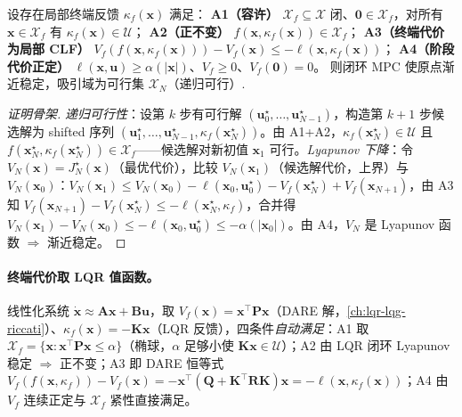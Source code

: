 \begin{theorem}
\label{thm:ddp-mayne}
设存在局部终端反馈 $\kappa_f(\mathbf{x})$ 满足：
\textbf{A1（容许）} $\mathcal{X}_f\subseteq\mathcal{X}$ 闭、$\mathbf{0}\in\mathcal{X}_f$，对所有 $\mathbf{x}\in\mathcal{X}_f$ 有 $\kappa_f(\mathbf{x})\in\mathcal{U}$；
\textbf{A2（正不变）} $f(\mathbf{x},\kappa_f(\mathbf{x}))\in\mathcal{X}_f$；
\textbf{A3（终端代价为局部 CLF）} $V_f(f(\mathbf{x},\kappa_f(\mathbf{x})))-V_f(\mathbf{x})\le-\ell(\mathbf{x},\kappa_f(\mathbf{x}))$；
\textbf{A4（阶段代价正定）} $\ell(\mathbf{x},\mathbf{u})\ge\alpha(|\mathbf{x}|)$、$V_f\ge0$、$V_f(\mathbf{0})=0$。
则闭环 MPC 使原点渐近稳定，吸引域为可行集 $\mathcal{X}_N$（递归可行）\cite{mayne2000constrained}.
\end{theorem}
\begin{proof}[证明骨架]
\emph{递归可行性}：设第 $k$ 步有可行解 $(\mathbf{u}_0^\star,\dots,\mathbf{u}_{N-1}^\star)$，构造第 $k+1$ 步候选解为 shifted 序列 $(\mathbf{u}_1^\star,\dots,\mathbf{u}_{N-1}^\star,\kappa_f(\mathbf{x}_N^\star))$。由 A1+A2，$\kappa_f(\mathbf{x}_N^\star)\in\mathcal{U}$ 且 $f(\mathbf{x}_N^\star,\kappa_f(\mathbf{x}_N^\star))\in\mathcal{X}_f$——候选解对新初值 $\mathbf{x}_1$ 可行。\emph{Lyapunov 下降}：令 $V_N(\mathbf{x})=J_N^\star(\mathbf{x})$（最优代价），比较 $V_N(\mathbf{x}_1)$（候选解代价，上界）与 $V_N(\mathbf{x}_0)$：$V_N(\mathbf{x}_1)\le V_N(\mathbf{x}_0)-\ell(\mathbf{x}_0,\mathbf{u}_0^\star)-V_f(\mathbf{x}_N^\star)+V_f(\mathbf{x}_{N+1})$，由 A3 知 $V_f(\mathbf{x}_{N+1})-V_f(\mathbf{x}_N^\star)\le-\ell(\mathbf{x}_N^\star,\kappa_f)$，合并得 $V_N(\mathbf{x}_1)-V_N(\mathbf{x}_0)\le-\ell(\mathbf{x}_0,\mathbf{u}_0^\star)\le-\alpha(|\mathbf{x}_0|)$。由 A4，$V_N$ 是 Lyapunov 函数 $\Rightarrow$ 渐近稳定。
\end{proof}

\paragraph{终端代价取 LQR 值函数。}\;
线性化系统 $\dot{\mathbf{x}}\approx\mathbf{A}\mathbf{x}+\mathbf{B}\mathbf{u}$，取 $V_f(\mathbf{x})=\mathbf{x}^\top\mathbf{P}\mathbf{x}$（DARE 解，\cref{ch:lqr-lqg-riccati}）、$\kappa_f(\mathbf{x})=-\mathbf{K}\mathbf{x}$（LQR 反馈），四条件\emph{自动满足}：A1 取 $\mathcal{X}_f=\{\mathbf{x}:\mathbf{x}^\top\mathbf{P}\mathbf{x}\le\alpha\}$（椭球，$\alpha$ 足够小使 $\mathbf{K}\mathbf{x}\in\mathcal{U}$）；A2 由 LQR 闭环 Lyapunov 稳定 $\Rightarrow$ 正不变；A3 即 DARE 恒等式 $V_f(f(\mathbf{x},\kappa_f))-V_f(\mathbf{x})=-\mathbf{x}^\top(\mathbf{Q}+\mathbf{K}^\top\mathbf{R}\mathbf{K})\mathbf{x}=-\ell(\mathbf{x},\kappa_f(\mathbf{x}))$；A4 由 $V_f$ 连续正定与 $\mathcal{X}_f$ 紧性直接满足。

